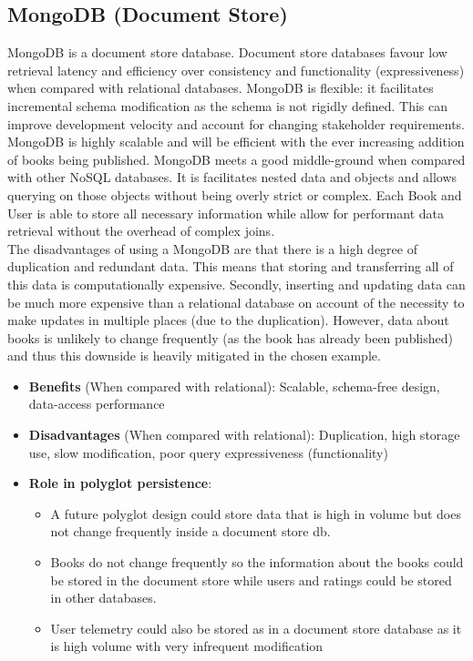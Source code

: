 \documentclass[11pt]{article}
\begin{document}
\subsection{MongoDB (Document Store)}
\label{sec:org4f11a86}
MongoDB is a document store database. Document store databases favour low retrieval latency and efficiency over consistency and functionality (expressiveness) when compared with relational databases. MongoDB is flexible: it facilitates incremental schema modification as the schema is not rigidly defined. This can improve development velocity and account for changing stakeholder requirements.\\
\linebreak
MongoDB is highly scalable and will be efficient with the ever increasing addition of books being published. MongoDB meets a good middle-ground when compared with other NoSQL databases. It is facilitates nested data and objects and allows querying on those objects without being overly strict or complex. Each Book and User is able to store all necessary information while allow for performant data retrieval without the overhead of complex joins.\\
\linebreak
The disadvantages of using a MongoDB are that there is a high degree of duplication and redundant data. This means that storing and transferring all of this data is computationally expensive. Secondly, inserting and updating data can be much more expensive than a relational database on account of the necessity to make updates in multiple places (due to the duplication). However, data about books is unlikely to change frequently (as the book has already been published) and thus this downside is heavily mitigated in the chosen example.

\begin{itemize}
\item \textbf{Benefits} (When compared with relational): Scalable, schema-free design, data-access performance
\item \textbf{Disadvantages} (When compared with relational): Duplication, high storage use, slow modification, poor query expressiveness (functionality)
\item \textbf{Role in polyglot persistence}:
\begin{itemize}
\item A future polyglot design could store data that is high in volume but does not change frequently inside a document store db.
\item Books do not change frequently so the information about the books could be stored in the document store while users and ratings could be stored in other databases.
\item User telemetry could also be stored as in a document store database as it is high volume with very infrequent modification
\end{itemize}
\end{itemize}
\end{document}

